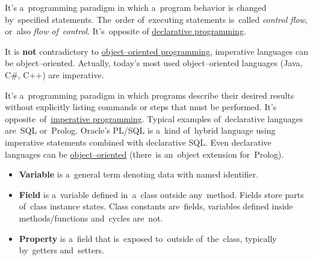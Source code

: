 





\label{imperativeprogramming}
It's a~programming paradigm in which a~program behavior is changed by~specified statements. The~order of~executing statements is~called \textit{control flow}, or~also \textit{flow of~control}. It's~opposite of \hyperref[declarativeprogramming]{declarative programming}.

\warning It is \textbf{not} contradictory to \hyperref[objectorientedprogramming]{object--oriented programming}, imperative languages can be object--oriented. Actually, today's most used object--oriented languages (Java, C\#, C++) are imperative.

\label{declarativeprogramming}
It's a~programming paradigm in which programs describe their desired results without explicitly listing commands or steps that must be performed. It's opposite~of~\hyperref[imperativeprogramming]{imperative programming}. Typical examples of~declarative languages are~SQL or~Prolog. Oracle's PL/SQL is a~kind of~hybrid language using imperative statements combined with declarative SQL. Even declarative languages can be \hyperref[objectorientedprogramming]{object--oriented} (there~is an~object extension for~Prolog).

\label{compiledinterpretedlanguages}

\label{variablefieldproperty}
\begin{itemize}
    \item \textbf{Variable} is a~general term denoting data with named identifier.
    \item \textbf{Field} is a~variable defined in~a~class outside any~method. Fields store parts of~class instance states. Class constants are~fields, variables defined inside \mbox{methods/functions} and~cycles are~not.
    \item \textbf{Property} is a~field that is~exposed to~outside of~the~class, typically by~getters and~setters.
\end{itemize}

